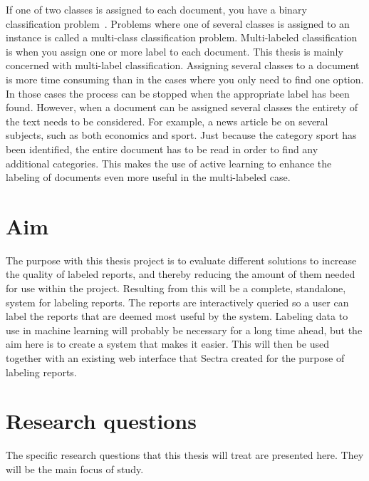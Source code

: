 If one of two classes is assigned to each document, you have a binary classification problem~\cite{bishop2006pattern}.
Problems where one of several classes is assigned to an instance is called a multi-class classification problem.
Multi-labeled classification is when you assign one or more label to each document.
This thesis is mainly concerned with multi-label classification.
Assigning several classes to a document is more time consuming than in the cases where you only need to find one option.
In those cases the process can be stopped when the appropriate label has been found.
However, when a document can be assigned several classes the entirety of the text needs to be considered.
For example, a news article be on several subjects, such as both economics and sport.
Just because the category sport has been identified, the entire document has to be read in order to find any additional categories.
This makes the use of active learning to enhance the labeling of documents even more useful in the multi-labeled case.  

\section{Aim}
\label{sec:aim}

The purpose with this thesis project is to evaluate different solutions to increase the quality of labeled reports, and thereby reducing the amount of them needed for use within the project.
Resulting from this will be a complete, standalone, system for labeling reports.
The reports are interactively queried so a user can label the reports that are deemed most useful by the system.
Labeling data to use in machine learning will probably be necessary for a long time ahead, but the aim here is to create a system that makes it easier.
This will then be used together with an existing web interface that Sectra created for the purpose of labeling reports.

\section{Research questions}
\label{sec:research-questions}

The specific research questions that this thesis will treat are presented here.
They will be the main focus of study.

